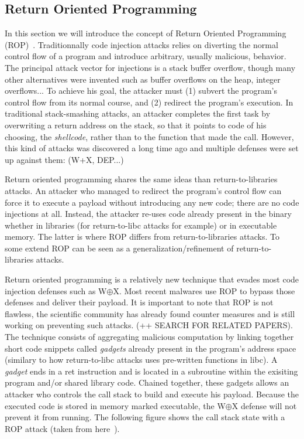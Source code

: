 \documentclass[10pt,twocolumn]{article}
\begin{document}
\subsection{Return Oriented Programming}
In this section we will introduce the concept of Return Oriented Programming (ROP)~\cite{roemer_return-oriented_2012}. Traditionnally code injection attacks relies on diverting the normal control flow of a program and introduce arbitrary, usually malicious, behavior. The principal attack vector for injections is a stack buffer overflow, though many other alternatives were invented such as buffer overflows on the heap, integer overflows... To achieve his goal, the attacker must (1) subvert the program's control flow from its normal course, and (2) redirect the program's execution. In traditional stack-smashing attacks, an attacker completes the first task by overwriting a return address on the stack, so that it points to code of his choosing, the \textit{shellcode}, rather than to the function that made the call. However, this kind of attacks was discovered a long time ago and multiple defenses were set up against them: (W+X, DEP...)

Return oriented programming shares the same ideas than return-to-libraries attacks. An attacker who managed to redirect the program's control flow can force it to execute a payload without introducing any new code; there are no code injections at all. Instead, the attacker re-uses code already present in the binary whether in libraries (for return-to-libc attacks for example) or in executable memory. The latter is where ROP differs from return-to-libraries attacks. To some extend ROP can be seen as a generalization/refinement of return-to-libraries attacks.

Return oriented programming is a relatively new technique that evades most code injection defenses such as W$\oplus$X. Most recent malwares use ROP to bypass those defenses and deliver their payload. It is important to note that ROP is not flawless, the scientific community has already found counter measures and is still working on preventing such attacks. (++ SEARCH FOR RELATED PAPERS). The technique consists of aggregating malicious computation by linking together short code snippets called \textit{gadgets} already present in the program's address space (similary to how return-to-libc attacks uses pre-written functions in libc).  A \textit{gadget} ends in a ret instruction and is located in a subroutine within the exisiting program and/or shared library code. Chained together, these gadgets allows an attacker who controls the call stack to build and execute his payload. Because the executed code is stored in memory marked executable, the W$\oplus$X defense will not prevent it from running. The following figure shows the call stack state with a ROP attack (taken from here~\cite{bletsch_jump-oriented_2011}).
\end{document}
